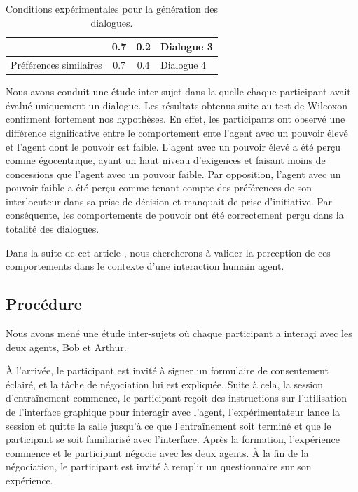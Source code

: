 \documentclass [french]{sig-alternate-05-2015}
\begin{document}
{\begin{table}[h]
\begin{tabular}{ |l|c|c|l| }
								\newline   &0.7 & 0.2 & Dialogue 3\\ 
								\hline
								\newline Préférences similaires& 0.7 & 0.4 & Dialogue 4\\
								\hline
							\end{tabular}
							\caption{Conditions expérimentales pour la génération des dialogues.} 
							\label{table:conditions}
						\end{table}
				Nous avons conduit une étude inter-sujet dans la quelle chaque participant avait évalué uniquement un dialogue. Les résultats obtenus  suite au test de Wilcoxon confirment fortement nos hypothèses. En effet, les participants ont observé une différence significative entre le comportement ente l'agent avec un pouvoir élevé et l'agent dont le pouvoir est faible. L'agent avec un pouvoir élevé a été perçu comme égocentrique, ayant un haut niveau d'exigences et faisant moins de concessions que l'agent avec un pouvoir faible. Par opposition, l'agent avec un pouvoir faible a été perçu comme tenant compte des préférences de son interlocuteur dans sa prise de décision et manquait de prise d'initiative. Par conséquente, les comportements de pouvoir ont été correctement perçu dans la totalité des dialogues.
				
				Dans la suite de cet article , nous chercherons à valider la perception de ces comportements dans le contexte d'une interaction humain agent. 
				
			
			
			\subsection{Procédure}
			
			Nous avons mené une étude inter-sujets où chaque participant a interagi avec les deux agents, Bob et Arthur.
			
			À l'arrivée, le participant est invité à signer un formulaire de consentement éclairé, et  la tâche de négociation lui est expliquée. 
			Suite à cela, la  session d'entraînement commence, le participant reçoit des instructions sur l'utilisation de l'interface graphique pour interagir avec l'agent, l'expérimentateur lance la session et quitte la salle jusqu'à ce que l'entraînement soit terminé et que le participant se soit familiarisé avec l'interface.
			 Après la formation, l'expérience commence et le participant négocie avec les deux agents. À la fin de la négociation, le participant est invité à remplir un questionnaire sur son expérience.
			
}
\end{document}
